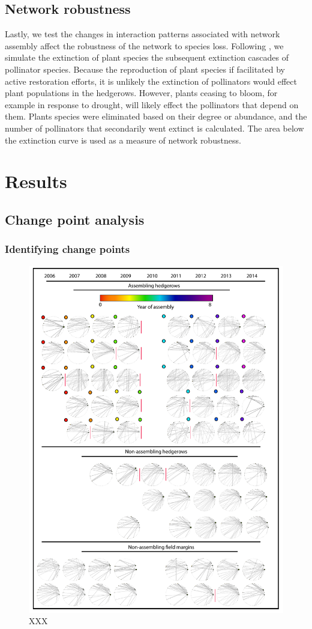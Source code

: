\documentclass[12pt]{article}
\begin{document}
\subsection*{Network robustness}

Lastly, we test the changes in interaction patterns associated with
network assembly affect the robustness of the network to species
loss. Following \cite{Memmott2004}, we simulate the extinction of
plant species the subsequent extinction cascades of pollinator
species. Because the reproduction of plant species if facilitated by
active restoration efforts, it is unlikely the extinction of
pollinators would effect plant populations in the hedgerows. However,
plants ceasing to bloom, for example in response to drought, will
likely effect the pollinators that depend on them. Plants species were
eliminated based on their degree or abundance, and the number of
pollinators that secondarily went extinct is calculated. The area
below the extinction curve is used as a measure of network robustness.


\section*{Results}
\label{sec:results}
\subsection*{Change point analysis}
\subsubsection*{Identifying change points}

\begin{figure}
  \centering
  \includegraphics[width=.8\textwidth]{../analysis/changePoint/plotting/networks.pdf}
  \caption{XXX}
  \label{fig:changePoints}
\end{figure}
\clearpage
\end{document}
